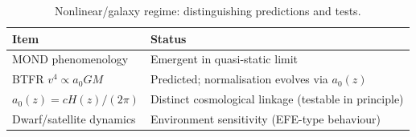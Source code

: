 \documentclass[11pt]{article}
\newcommand{\azero}{a_0}
\begin{document}
\begin{table}[ht]
\centering
\caption{Nonlinear/galaxy regime: distinguishing predictions and tests.}
\begin{tabular}{@{}ll@{}}
\toprule
Item & Status \\ \midrule
MOND phenomenology & Emergent in quasi-static limit \\
BTFR $v^4\propto \azero GM$ & Predicted; normalisation evolves via $\azero(z)$ \\
$\azero(z)=cH(z)/(2\pi)$ & Distinct cosmological linkage (testable in principle) \\
Dwarf/satellite dynamics & Environment sensitivity (EFE-type behaviour) \\
\bottomrule
\end{tabular}
\end{table}
\end{document}

